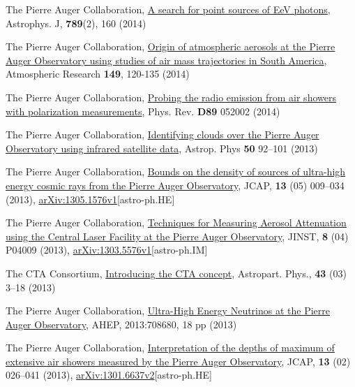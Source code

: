 \begin{etaremune}
\item {}The Pierre Auger Collaboration, \href{http://iopscience.iop.org/0004-637X/789/2/160}{{A search for point sources of EeV photons}}, Astrophys. J, {\bf{789}}(2), 160 (2014)

\item {}The Pierre Auger Collaboration, \href{http://dx.doi.org/10.1016/j.atmosres.2014.05.021}{{Origin of atmospheric aerosols at the Pierre Auger Observatory using studies of air mass trajectories in South America}}, Atmospheric Research {\bf{149}}, 120-135 (2014)

\item {}The Pierre Auger Collaboration, \href{http://dx.doi.org/10.1103/PhysRevD.89.052002}{{Probing the radio emission from air showers with polarization measurements}}, Phys. Rev. {\bf{D89}} 052002 (2014)

\item {}The Pierre Auger Collaboration, \href{http://dx.doi.org/10.1016/j.astropartphys.2013.09.004}{{Identifying clouds over the Pierre Auger Observatory using infrared satellite data}}, Astrop. Phys {\bf{50}} 92--101 (2013)

\item {}The Pierre Auger Collaboration, \href{http://dx.doi.org/10.1088/1475-7516/2013/05/009}{{Bounds on the density of sources of ultra-high energy cosmic rays from the Pierre Auger Observatory}}, JCAP, {\bf{13}} (05) 009--034 (2013), \href{http://arxiv.org/abs/1305.1576}{arXiv:1305.1576v1}[astro-ph.HE]

\item {}The Pierre Auger Collaboration, \href{http://dx.doi.org/10.1088/1748-0221/8/04/P04009}{{Techniques for Measuring Aerosol Attenuation using the Central Laser Facility at the Pierre Auger Observatory}}, JINST, {\bf{8}} (04) P04009 (2013), \href{http://arxiv.org/abs/1303.5576}{arXiv:1303.5576v1}[astro-ph.IM]

\item {}The CTA Consortium, \href{http://dx.doi.org/10.1016/j.astropartphys.2013.01.007}{{Introducing the CTA concept}}, Astropart. Phys., {\bf{43}} (03) 3--18 (2013)

\item {}The Pierre Auger Collaboration, \href{http://dx.doi.org/10.1155/2013/708680
}{{Ultra-High Energy Neutrinos at the Pierre Auger Observatory}}, AHEP, 2013:708680, 18 pp (2013)

\item {}The Pierre Auger Collaboration, \href{http://dx.doi.org/10.1088/1475-7516/2013/02/026}{{Interpretation of the depths of maximum of extensive air showers measured by the Pierre Auger Observatory}}, JCAP, {\bf{13}} (02) 026--041 (2013), \href{http://arxiv.org/abs/1301.6637}{arXiv:1301.6637v2}[astro-ph.HE]


\end{etaremune}
